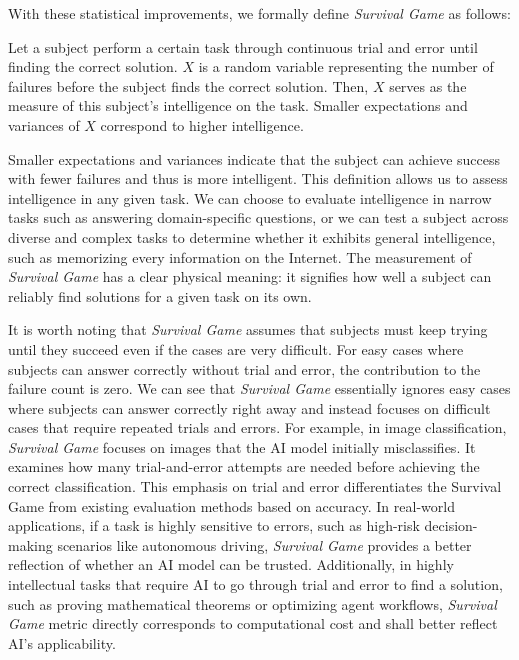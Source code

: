 With these statistical improvements, we formally define \textit{Survival Game} as follows:
\begin{definition}
Let a subject perform a certain task through continuous trial and error until finding the correct solution. \( X \) is a random variable representing the number of failures before the subject finds the correct solution. Then, $X$ serves as the measure of this subject's intelligence on the task. Smaller expectations and variances of $X$ correspond to higher intelligence.
\end{definition}
Smaller expectations and variances indicate that the subject can achieve success with fewer failures and thus is more intelligent.
This definition allows us to assess intelligence in any given task. We can choose to evaluate intelligence in narrow tasks such as answering domain-specific questions, or we can test a subject across diverse and complex tasks to determine whether it exhibits general intelligence, such as memorizing every information on the Internet.
The measurement of \textit{Survival Game} has a clear physical meaning: it signifies how well a subject can reliably find solutions for a given task on its own.


It is worth noting that \textit{Survival Game} assumes that subjects must keep trying until they succeed even if the cases are very difficult. For easy cases where subjects can answer correctly without trial and error, the contribution to the failure count is zero. We can see that \textit{Survival Game} essentially ignores easy cases where subjects can answer correctly right away and instead focuses on difficult cases that require repeated trials and errors.
For example, in image classification, \textit{Survival Game} focuses on images that the AI model initially misclassifies. It examines how many trial-and-error attempts are needed before achieving the correct classification. This emphasis on trial and error differentiates the Survival Game from existing evaluation methods based on accuracy.
In real-world applications, if a task is highly sensitive to errors, such as high-risk decision-making scenarios like autonomous driving, \textit{Survival Game} provides a better reflection of whether an AI model can be trusted. Additionally, in highly intellectual tasks that require AI to go through trial and error to find a solution, such as proving mathematical theorems or optimizing agent workflows, \textit{Survival Game} metric directly corresponds to computational cost and shall better reflect AI's applicability.


